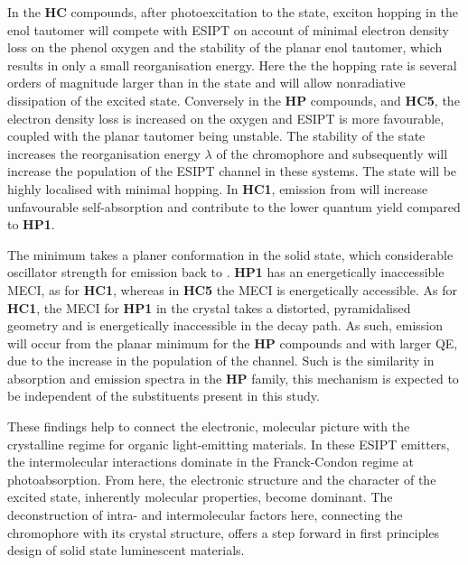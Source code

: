 In the \textbf{HC} compounds, after photoexcitation to the \sone{} state, exciton hopping in the enol tautomer will compete with ESIPT on account of minimal electron density loss on the phenol oxygen and the stability of the planar enol tautomer, which results in only a small reorganisation energy. Here the the hopping rate is several orders of magnitude larger than in the \Kstar{} state and will allow nonradiative dissipation of the excited state. Conversely in the \textbf{HP} compounds, and \textbf{HC5}, the electron density loss is increased on the oxygen and ESIPT is more favourable, coupled with the planar \Estar{} tautomer being unstable. The stability of the \Kstar{} state increases the reorganisation energy $\lambda$ of the chromophore and subsequently will increase the population of the ESIPT channel in these systems. The \Kstar{} state will be highly localised with minimal hopping. In \textbf{HC1}, emission from \Estar{} will increase unfavourable self-absorption and contribute to the lower quantum yield compared to \textbf{HP1}.

The \Kstar{} minimum takes a planer conformation in the solid state, which considerable oscillator strength for emission back to \szero{}. \textbf{HP1} has an energetically inaccessible MECI, as for \textbf{HC1}, whereas in \textbf{HC5} the MECI is energetically accessible. As for \textbf{HC1}, the MECI for \textbf{HP1} in the crystal takes a distorted, pyramidalised geometry and is energetically inaccessible in the decay path. As such, emission will occur from the planar \Kstar{} minimum for the \textbf{HP} compounds and with larger QE, due to the increase in the population of the \Kstar{} channel. Such is the similarity in absorption and emission spectra in the \textbf{HP} family, this mechanism is expected to be independent of the substituents present in this study. 

These findings help to connect the electronic, molecular picture with the crystalline regime for organic light-emitting materials. In these ESIPT emitters, the intermolecular interactions dominate in the Franck-Condon regime at photoabsorption. From here, the electronic structure and the character of the excited state, inherently molecular properties, become dominant. The deconstruction of intra- and intermolecular factors here, connecting the chromophore with its crystal structure, offers a step forward in first principles design of solid state luminescent materials.
